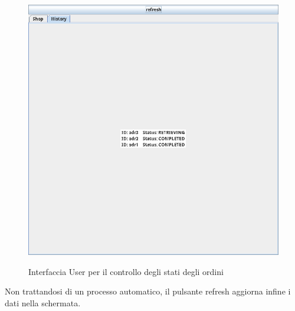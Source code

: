 \begin{figure}
    \includegraphics[width=\textwidth]{section/usage_examples/figure/application-history.png}
    \label{fig:application-history}
    \caption{Interfaccia User per il controllo degli stati degli ordini}
\end{figure}

Non trattandosi di un processo automatico, il pulsante refresh aggiorna infine i dati nella schermata.

